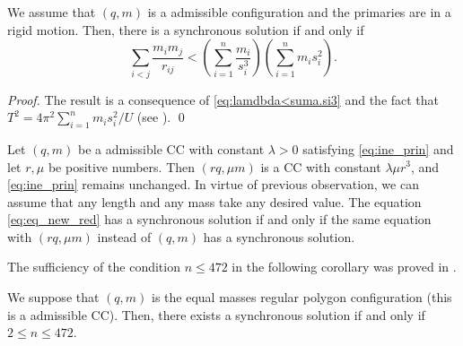 \documentclass[smallcondensed]{svjour3}
\begin{document}
\begin{corollary}
We assume that $(q,m)$ is a admissible  configuration and  the primaries are in a rigid motion. Then, there is a synchronous solution if and only if
 \begin{equation}\label{eq:ine_prin}
 \sum_{i<j}\frac{m_im_j}{r_{ij}}<\left(\sum_{i=1}^n\frac{m_i}{s_i^3}\right)\left(\sum_{i=1}^nm_is_i^2\right).
\end{equation}
\end{corollary}

\begin{proof}
The result is a consequence of \eqref{eq:lamdbda<suma.si3} and the fact that $T^2=4\pi^2 \sum_{i=1}^{n}m_is_i^2/U$   (see \cite[p. 109]{JaumeLlibre276}).
\qed\end{proof}


\begin{remark}\label{com:sincronicas}

Let $(q,m)$  be a  admissible  CC  with constant $\lambda>0$ satisfying \eqref{eq:ine_prin} and let $r,\mu$ be positive numbers. Then  $(rq,\mu m)$ is a CC with constant $\lambda \mu r^3$, and \eqref{eq:ine_prin} remains unchanged. In virtue of previous observation, we can assume that any  length and any mass take any  desired value. The equation \eqref{eq:eq_new_red} has a synchronous solution if and only if the same equation with $(rq,\mu m)$ instead of $(q,m)$ has a synchronous solution.

\end{remark}





The sufficiency of the condition $n\leq 472$ in the following corollary  was proved in \cite{li2013characterization}.

\begin{corollary}\label{cor:nleq472}
We suppose that $(q,m)$ is the equal masses regular polygon configuration  (this is a admissible CC). Then, there exists a synchronous solution if and only if $2\leq n\leq 472$.
\end{corollary}
\end{document}
